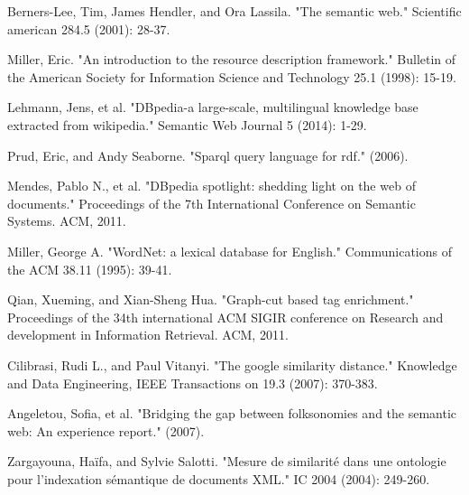 %
%
\begin{thebibliography}{11}
%
Berners-Lee, Tim, James Hendler, and Ora Lassila. "The semantic web." Scientific american 284.5 (2001): 28-37.

Miller, Eric. "An introduction to the resource description framework." Bulletin of the American Society for Information Science and Technology 25.1 (1998): 15-19.

Lehmann, Jens, et al. "DBpedia-a large-scale, multilingual knowledge base extracted from wikipedia." Semantic Web Journal 5 (2014): 1-29.

Prud, Eric, and Andy Seaborne. "Sparql query language for rdf." (2006).

Mendes, Pablo N., et al. "DBpedia spotlight: shedding light on the web of documents." Proceedings of the 7th International Conference on Semantic Systems. ACM, 2011.

Miller, George A. "WordNet: a lexical database for English." Communications of the ACM 38.11 (1995): 39-41.

Qian, Xueming, and Xian-Sheng Hua. "Graph-cut based tag enrichment." Proceedings of the 34th international ACM SIGIR conference on Research and development in Information Retrieval. ACM, 2011.

Cilibrasi, Rudi L., and Paul Vitanyi. "The google similarity distance." Knowledge and Data Engineering, IEEE Transactions on 19.3 (2007): 370-383.

Angeletou, Sofia, et al. "Bridging the gap between folksonomies and the semantic web: An experience report." (2007).

Zargayouna, Haïfa, and Sylvie Salotti. "Mesure de similarité dans une ontologie pour l'indexation sémantique de documents XML." IC 2004 (2004): 249-260.
\end{thebibliography}